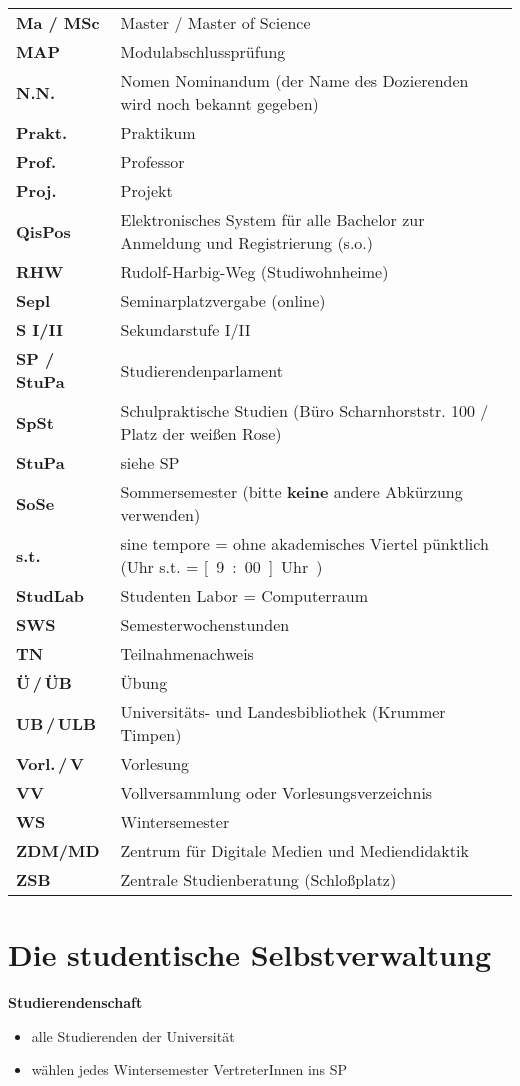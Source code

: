\begin{longtable}{p{} p{}}
  \textbf{Ma / MSc} & Master / Master of Science\\
  \textbf{MAP} & Modulabschlussprüfung\\
  \textbf{N.N.} & Nomen Nominandum (der Name des Dozierenden wird noch bekannt gegeben)\\
  \textbf{Prakt.} & Praktikum\\
  \textbf{Prof.} & Professor\\
  \textbf{Proj.} & Projekt\\
  \textbf{QisPos} & Elektronisches System für alle Bachelor zur Anmeldung und Registrierung (s.o.)\\
  \textbf{RHW} & Rudolf-Harbig-Weg (Studiwohnheime)\\
  \textbf{Sepl} & Seminarplatzvergabe (online)\\
  \textbf{S I/II} & Sekundarstufe I/II\\
  \textbf{SP / StuPa} & Studierendenparlament\\ 
  \textbf{SpSt} & Schulpraktische Studien (Büro Scharnhorststr. 100 / Platz der weißen Rose)\\
  \textbf{StuPa} & siehe SP\\
  \textbf{SoSe} & Sommersemester (bitte \textbf{keine} andere Abkürzung verwenden)\\
  \textbf{s.t.}	& sine tempore = ohne akademisches Viertel pünktlich (\unit[9]{Uhr} s.t. = \unit[9:00]{Uhr})\\
  \textbf{StudLab} & Studenten Labor = Computerraum\\
  \textbf{SWS} & Semesterwochenstunden\\
  \textbf{TN} & Teilnahmenachweis\\
  \textbf{Ü\,/\,ÜB} & Übung\\
  \textbf{UB\,/\,ULB} & Universitäts- und Landesbibliothek (Krummer Timpen)\\
  \textbf{Vorl.\,/\,V} & Vorlesung\\
  \textbf{VV} & Vollversammlung oder Vorlesungsverzeichnis\\
  \textbf{WS} & Wintersemester\\
  \textbf{ZDM/MD} & Zentrum für Digitale Medien und Mediendidaktik\\
  \textbf{ZSB} & Zentrale Studienberatung (Schloßplatz)\\
\end{longtable} 

\newpage
\section{Die studentische Selbstverwaltung}
\textbf{Studierendenschaft}
\begin{itemize}
 \item alle Studierenden der Universität
 \item wählen jedes Wintersemester VertreterInnen ins SP
\end{itemize}

